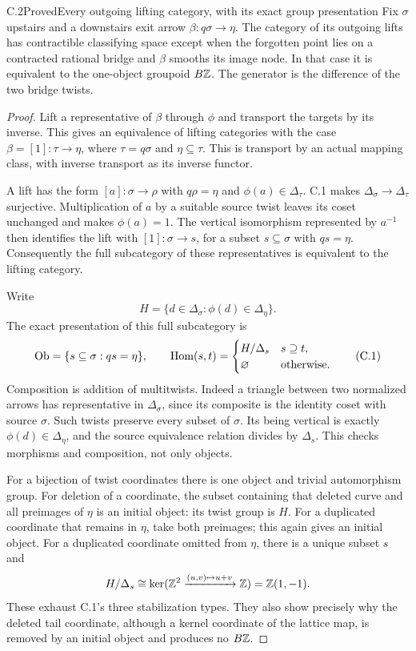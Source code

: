 \begin{result}{C.2}{Proved}{Every outgoing lifting category, with its exact group presentation}
Fix $\sigma$ upstairs and a downstairs exit arrow $\beta:q\sigma\to\eta$. The category of its outgoing lifts has contractible classifying space except when the forgotten point lies on a contracted rational bridge and $\beta$ smooths its image node. In that case it is equivalent to the one-object groupoid $B\mathbb Z$. The generator is the difference of the two bridge twists.
\end{result}
\begin{proof}
Lift a representative of $\beta$ through $\phi$ and transport the targets by its inverse. This gives an equivalence of lifting categories with the case $\beta=[1]:\tau\to\eta$, where $\tau=q\sigma$ and $\eta\subseteq\tau$. This is transport by an actual mapping class, with inverse transport as its inverse functor.

A lift has the form $[a]:\sigma\to\rho$ with $q\rho=\eta$ and $\phi(a)\in\Delta_\tau$. C.1 makes $\Delta_\sigma\to\Delta_\tau$ surjective. Multiplication of $a$ by a suitable source twist leaves its coset unchanged and makes $\phi(a)=1$. The vertical isomorphism represented by $a^{-1}$ then identifies the lift with $[1]:\sigma\to s$, for a subset $s\subseteq\sigma$ with $qs=\eta$. Consequently the full subcategory of these representatives is equivalent to the lifting category.

Write
\[
 H=\{d\in\Delta_\sigma:\phi(d)\in\Delta_\eta\}.
\]
The exact presentation of this full subcategory is
\[
 \operatorname{Ob}=\{s\subseteq\sigma:qs=\eta\},\qquad
 \operatorname{Hom}(s,t)=
 \begin{cases}H/\Delta_s&s\supseteq t,\\
 \varnothing&\text{otherwise}.
 \end{cases}                                                   \tag{C.1}
\]
Composition is addition of multitwists. Indeed a triangle between two normalized arrows has representative in $\Delta_\sigma$, since its composite is the identity coset with source $\sigma$. Such twists preserve every subset of $\sigma$. Its being vertical is exactly $\phi(d)\in\Delta_\eta$, and the source equivalence relation divides by $\Delta_s$. This checks morphisms and composition, not only objects.

For a bijection of twist coordinates there is one object and trivial automorphism group. For deletion of a coordinate, the subset containing that deleted curve and all preimages of $\eta$ is an initial object: its twist group is $H$. For a duplicated coordinate that remains in $\eta$, take both preimages; this again gives an initial object. For a duplicated coordinate omitted from $\eta$, there is a unique subset $s$ and
\[
 H/\Delta_s\cong\ker(\mathbb Z^2\xrightarrow{(u,v)\mapsto u+v}\mathbb Z)
 =\mathbb Z(1,-1).
\]
These exhaust C.1's three stabilization types. They also show precisely why the deleted tail coordinate, although a kernel coordinate of the lattice map, is removed by an initial object and produces no $B\mathbb Z$.
\end{proof}

